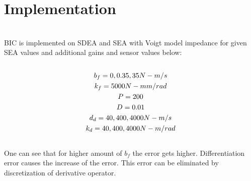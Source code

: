 \documentclass[a4paper,12pt]{article}
\begin{document}
\section{Implementation}\\
BIC is implemented on SDEA and SEA with Voigt model impedance for given SEA values and additional gains and sensor values below:
\begin{equation}
\begin{multlined}\\
b_f=0,0.35,35 N-m/s\\
k_f=5000 N-mm/rad\\
P=200\\
D=0.01\\
d_d=40,400,4000 N-m/s\\
k_d=40,400,4000 N-m/rad\\
\end{multlined}\\
\end{equation}
One can see that for higher amount of $b_f$ the error gets higher. Differentiation error causes the increase of the error. This error can be eliminated by discretization of derivative operator.
\end{document}
